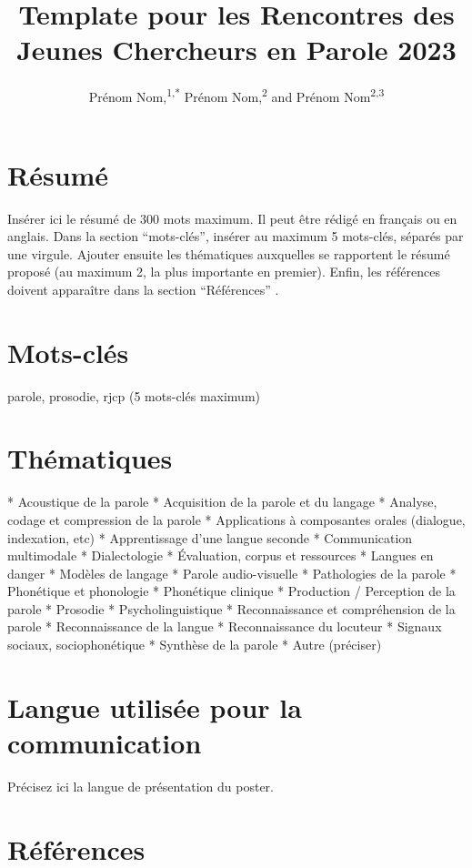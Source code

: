 \documentclass[letterpaper,10pt]{article}
\newcommand\authoraffil[1]{\textsuperscript{#1}}
\begin{document}
\title{Template pour les Rencontres des Jeunes Chercheurs en Parole 2023}
\author{Prénom Nom,\authoraffil{1,*} Prénom Nom,\authoraffil{2} and Prénom Nom\authoraffil{2,3}}

\address{\authoraffil{1} affiliation 1\\
\authoraffil{2} affiliation 2\\
\authoraffil{3} affiliation 3}

\email{\authoraffil{*}adresse.mail@premierAuteur.fr} %

\section*{Résumé}
Insérer ici le résumé de 300 mots maximum. Il peut être rédigé en français ou en anglais. Dans la section “mots-clés”, insérer au maximum 5 mots-clés, séparés par une virgule. Ajouter ensuite les thématiques auxquelles se rapportent le résumé proposé (au maximum 2, la plus importante en premier). Enfin, les références doivent apparaître dans la section “Références” \cite{TRAMERETAL_2023AcademicAuthorHow}.

\section*{Mots-clés}\label{sec:mots-cles}
parole, prosodie, rjcp (5 mots-clés maximum)

\section*{Thématiques}
* Acoustique de la parole
* Acquisition de la parole et du langage 
* Analyse, codage et compression de la parole
* Applications à composantes orales (dialogue, indexation, etc)
* Apprentissage d’une langue seconde
* Communication multimodale 
* Dialectologie 
* Évaluation, corpus et ressources 
* Langues en danger 
* Modèles de langage 
* Parole audio-visuelle
* Pathologies de la parole 
* Phonétique et phonologie 
* Phonétique clinique 
* Production / Perception de la parole
* Prosodie 
* Psycholinguistique 
* Reconnaissance et compréhension de la parole 
* Reconnaissance de la langue
* Reconnaissance du locuteur
* Signaux sociaux, sociophonétique 
* Synthèse de la parole
* Autre (préciser)

\section*{Langue utilisée pour la communication}
Précisez ici la langue de présentation du poster.


\section*{Références}
\end{document}

